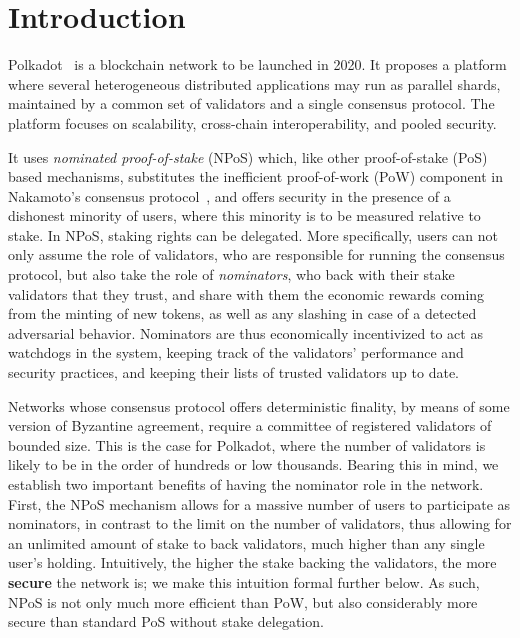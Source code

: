 \section{Introduction}

Polkadot~\cite{wood2016polkadot} is a blockchain network to be launched in 2020. It proposes a platform where several heterogeneous distributed applications may run as parallel shards, maintained by a common set of validators and a single consensus protocol. The platform focuses on scalability, cross-chain interoperability, and pooled security. 

It uses \emph{nominated proof-of-stake} (NPoS) which, like other proof-of-stake (PoS) based mechanisms, substitutes the inefficient proof-of-work (PoW) component in Nakamoto’s consensus protocol~\cite{nakamoto2019bitcoin}, and offers security in the presence of a dishonest minority of users, where this minority is to be measured relative to stake. In NPoS, staking rights can be delegated. More specifically, users can not only assume the role of validators, who are responsible for running the consensus protocol, but also take the role of \emph{nominators}, who back with their stake validators that they trust, and share with them the economic rewards coming from the minting of new tokens, as well as any slashing in case of a detected adversarial behavior. Nominators are thus economically incentivized to act as watchdogs in the system, keeping track of the validators' performance and security practices, and keeping their lists of trusted validators up to date.

Networks whose consensus protocol offers deterministic finality, by means of some version of Byzantine agreement, require a committee of registered validators of bounded size. This is the case for Polkadot, where the number of validators is likely to be in the order of hundreds or low thousands. 
Bearing this in mind, we establish two important benefits of having the nominator role in the network. 
First, the NPoS mechanism allows for a massive number of users to participate as nominators, in contrast to the limit on the number of validators, thus allowing for an unlimited amount of stake to back validators, much higher than any single user's holding. Intuitively, the higher the stake backing the validators, the more \textbf{secure} the network is; we make this intuition formal further below. As such, NPoS is not only much more efficient than PoW, but also considerably more secure than standard PoS without stake delegation.

